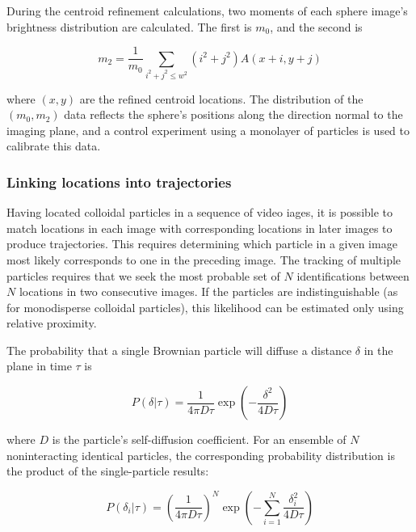 During the centroid refinement calculations, two moments of each sphere image's brightness 
distribution are calculated.  The first is $m_0$, and the second is 

\begin{center}\begin{equation}m_2 = \frac{1}{m_0} \sum_{i^2+j^2 \leq w^2} (i^2 + j^2)A(x+i,y+j)
\end{equation}\end{center}

where $(x,y)$ are the refined centroid locations.  The distribution of the $(m_0,m_2)$ data reflects the
sphere's positions along the direction normal to the imaging plane, and a control experiment using a 
monolayer of particles is used to calibrate this data.

\subsubsection{Linking locations into trajectories}

Having located colloidal particles in a sequence of video iages, it is possible to 
match locations in each image with corresponding locations in later images to produce
trajectories.  This requires determining which particle in a given image
most likely corresponds to one in the preceding image.  The tracking of 
multiple particles requires that we seek the most probable set of $N$ identifications 
between $N$ locations in two consecutive images. If the particles are indistinguishable (as for
monodisperse colloidal particles), this likelihood can be estimated only using relative
proximity.

The probability that a single Brownian particle will diffuse a distance $\delta$ in the plane 
in time $\tau$ is

\begin{center}\begin{equation}P(\delta|\tau) = \frac{1}{4\pi D\tau} \exp{ \left( -\frac{\delta^2}{4D\tau} \right) }
\end{equation}\end{center}

where $D$ is the particle's self-diffusion coefficient.  For an ensemble of $N$ noninteracting
identical particles, the corresponding probability distribution is the product of the 
single-particle results:

\begin{center}\begin{equation}P({\delta_i}|\tau) = \left( \frac{1}{4\pi D\tau} \right)^N 
\exp{ \left( -\sum_{i=1}^N \frac{\delta_i^2}{4D\tau} \right) }
\end{equation}\end{center}

